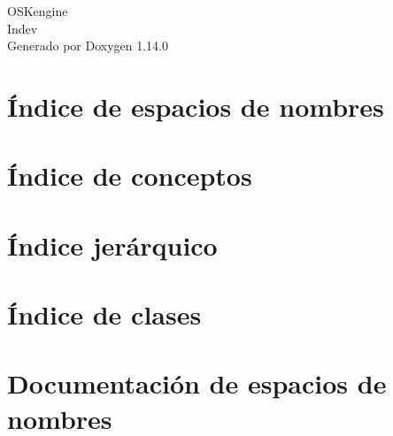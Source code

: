\documentclass[twoside]{book}
\newcommand{\+}{\discretionary{\mbox{\scriptsize$\hookleftarrow$}}{}{}}
\newcommand{\clearemptydoublepage}{%
    \newpage{\pagestyle{empty}\cleardoublepage}%
  }
\begin{document}
  \raggedbottom
  \begin{titlepage}
  \vspace*{7cm}
  \begin{center}%
  {\Large OSKengine}\\
  [1ex]\large Indev \\
  \vspace*{1cm}
  {\large Generado por Doxygen 1.14.0}\\
  \end{center}
  \end{titlepage}
  \clearemptydoublepage
  \tableofcontents
  \clearemptydoublepage






\chapter{Índice de espacios de nombres}

\chapter{Índice de conceptos}

\chapter{Índice jerárquico}

\chapter{Índice de clases}

\chapter{Documentación de espacios de nombres}
























\end{document}
